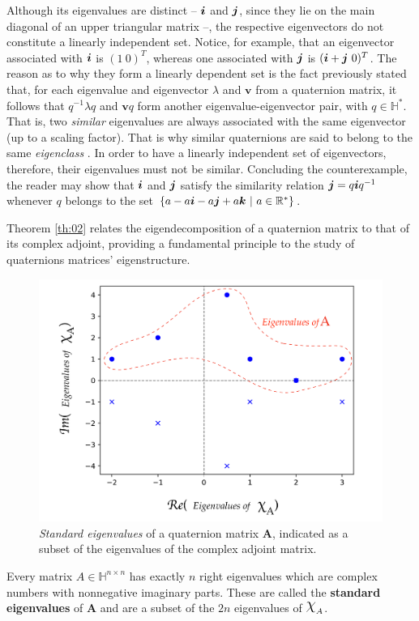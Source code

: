 Although its eigenvalues are distinct -- $ \boldsymbol{i} $ and $ \boldsymbol{j} $, since they lie on the main diagonal of an upper triangular matrix --, the respective eigenvectors do not constitute a linearly independent set. Notice, for example, that an eigenvector associated with $ \boldsymbol{i} $ is $ (1 \ 0)^T $, whereas one associated with $ \boldsymbol{j} $ is $ (\boldsymbol{i} + \boldsymbol{j} \ 0)^T $. The reason as to why they form a linearly dependent set is the fact previously stated that, for each eigenvalue and eigenvector $ \lambda $ and $ \mathbf{v} $ from a quaternion matrix, it follows that $ q^{-1}\lambda q $ and $ \mathbf{v}q $ form another eigenvalue-eigenvector pair, with $ q \in \mathbb{H}^\ast $. That is, two \emph{similar} eigenvalues are always associated with the same eigenvector (up to a scaling factor). That is why similar quaternions are said to belong to the same \emph{eigenclass} \cite{de2000right}. In order to have a linearly independent set of eigenvectors, therefore, their eigenvalues must not be similar. Concluding the counterexample, the reader may show that $ \boldsymbol{i} $ and $ \boldsymbol{j} $ satisfy the similarity relation $ \boldsymbol{j} = q \boldsymbol{i} q^{-1} $ whenever $q$ belongs to the set $ \{ a - a\boldsymbol{i} - a\boldsymbol{j} + a\boldsymbol{k} \ | \ a\in \mathbb{R}^\ast \} $.

Theorem \ref{th:02} relates the eigendecomposition of a quaternion matrix to that of its complex adjoint, providing a fundamental principle to the study of quaternions matrices' eigenstructure.

\begin{figure}
    \centering
    \caption{\emph{Standard eigenvalues} of a quaternion matrix $ \mathbf{A} $, indicated as a subset of the eigenvalues of the complex adjoint matrix.}
    \includegraphics[width=0.7\linewidth]{Figures/complex_adjoint_eigvals_EN.pdf}
    \floatsource
\end{figure}


\begin{theorem}
    \label{th:02}
    Every matrix $ A \in \mathbb{H}^{n \times n} $ has exactly $ n $ right eigenvalues which are complex numbers with nonnegative imaginary parts. These are called the \textbf{standard eigenvalues} of $ \mathbf{A} $ and are a subset of the $ 2n $ eigenvalues of $ \rchi_A $.
\end{theorem}

